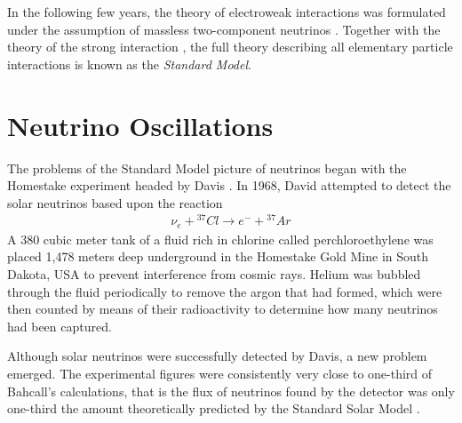 \documentclass[english]{article}
\begin{document}
    In the following few years, the theory of electroweak interactions was formulated under the assumption of massless two-component neutrinos \cite{glashow1961} \cite{goldstonesalamweinberg1962} \cite{weinberg1967}. Together with the theory of the strong interaction \cite{grosswilczek1973} \cite{politzer1973}, the full theory describing all elementary particle interactions is known as the \textit{Standard Model}.

\section{Neutrino Oscillations}
	The problems of the Standard Model picture of neutrinos began with the Homestake experiment headed by Davis \cite{davis1968}. In 1968, David attempted to detect the solar neutrinos based upon the reaction
    \begin{gather}
    	\nu_{e} + {}^{37} Cl \rightarrow e^{-} + {}^{37} Ar
    \end{gather}
    A 380 cubic meter tank of a fluid rich in chlorine called perchloroethylene was placed 1,478 meters deep underground in the Homestake Gold Mine in South Dakota, USA to prevent interference from cosmic rays. Helium was bubbled through the fluid periodically to remove the argon that had formed, which were then counted by means of their radioactivity to determine how many neutrinos had been captured.
    
    Although solar neutrinos were successfully detected by Davis, a new problem emerged. The experimental figures were consistently very close to one-third of Bahcall's calculations, that is the flux of neutrinos found by the detector was only one-third the amount theoretically predicted by the Standard Solar Model \cite{davis1998} \cite{bahcall2004}.
\end{document}
